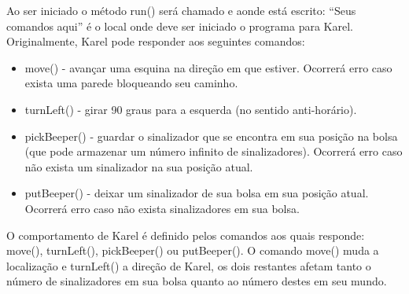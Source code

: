 \documentclass[a4paper,11pt]{article}
\begin{document}
Ao ser iniciado o método run() será chamado e aonde está escrito: ``Seus comandos aqui'' é o local onde deve ser iniciado o programa para Karel. 
Originalmente, Karel pode responder aos seguintes comandos: \vspace{-1em}
\begin{itemize}
 \item move() - avançar uma esquina na direção em que estiver. Ocorrerá erro caso exista uma parede bloqueando seu caminho.
 \item turnLeft() - girar 90 graus para a esquerda (no sentido anti-horário).
 \item pickBeeper() - guardar o sinalizador que se encontra em sua posição na bolsa (que pode armazenar um número infinito de sinalizadores). Ocorrerá erro caso não exista um sinalizador na sua posição atual.
 \item putBeeper() - deixar um sinalizador de sua bolsa em sua posição atual. Ocorrerá erro caso não exista sinalizadores em sua bolsa.
\end{itemize} 

O comportamento de Karel é definido pelos comandos aos quais responde: move(), turnLeft(), pickBeeper() ou putBeeper(). O comando move() muda a localização e turnLeft() a direção de Karel, os dois restantes afetam tanto o número de sinalizadores em sua bolsa quanto ao número destes em seu mundo.
\end{document}
